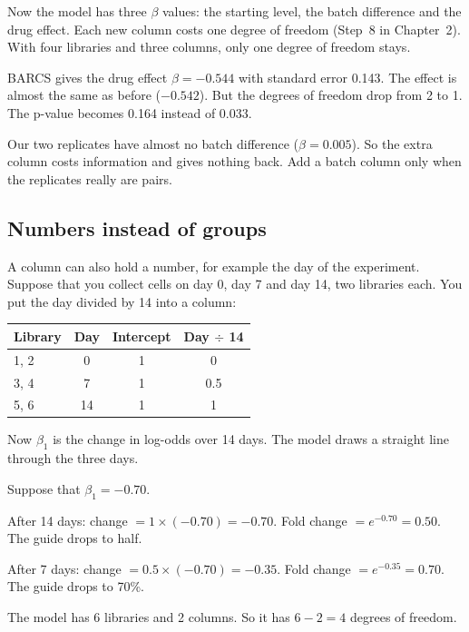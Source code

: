 Now the model has three $\beta$ values: the starting level, the batch
difference and the drug effect. Each new column costs one degree of freedom
(Step~8 in Chapter~2). With four libraries and three columns, only one degree of freedom
stays.

\begin{worked}
BARCS gives the drug effect $\beta = -0.544$ with standard error 0.143.
The effect is almost the same as before ($-0.542$). But the degrees of
freedom drop from 2 to 1. The p-value becomes 0.164 instead of 0.033.

Our two replicates have almost no batch difference ($\beta = 0.005$). So
the extra column costs information and gives nothing back. Add a batch
column only when the replicates really are pairs.
\end{worked}

\subsection{Numbers instead of groups}

A column can also hold a number, for example the day of the experiment.
Suppose that you collect cells on day 0, day 7 and day 14, two libraries
each. You put the day divided by 14 into a column:

\begin{center}
\begin{tabular}{lc|cc}
\toprule
Library & Day & Intercept & Day $\div$ 14\\
\midrule
1, 2 & 0  & 1 & 0\\
3, 4 & 7  & 1 & 0.5\\
5, 6 & 14 & 1 & 1\\
\bottomrule
\end{tabular}
\end{center}

Now $\beta_1$ is the change in log-odds over 14 days. The model draws a
straight line through the three days.

\begin{worked}
Suppose that $\beta_1 = -0.70$.

After 14 days: change $= 1 \times (-0.70) = -0.70$. Fold change
$= e^{-0.70} = 0.50$. The guide drops to half.

After 7 days: change $= 0.5 \times (-0.70) = -0.35$. Fold change
$= e^{-0.35} = 0.70$. The guide drops to 70\%.

The model has 6 libraries and 2 columns. So it has $6 - 2 = 4$ degrees of
freedom.
\end{worked}

